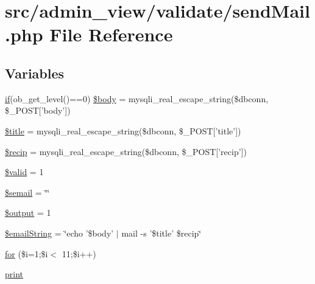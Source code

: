 \hypertarget{sendMail_8php}{\section{src/admin\-\_\-view/validate/send\-Mail.php \-File \-Reference}
\label{sendMail_8php}
}
\subsection*{\-Variables}
\begin{DoxyCompactItemize}
\item 
\hyperlink{updateBenchDB_8php_a0c1f2915e12defa9f4d515347d884dee}{if}(ob\-\_\-get\-\_\-level()==0) \hyperlink{sendMail_8php_a3413c11d1f6b9e38ea54c7dffc0e5ea3}{\$body} = mysqli\-\_\-real\-\_\-escape\-\_\-string(\$dbconn, \$\-\_\-\-P\-O\-S\-T\mbox{[}'body'\mbox{]})
\item 
\hyperlink{sendMail_8php_ada57e7bb7c152edad18fe2f166188691}{\$title} = mysqli\-\_\-real\-\_\-escape\-\_\-string(\$dbconn, \$\-\_\-\-P\-O\-S\-T\mbox{[}'title'\mbox{]})
\item 
\hyperlink{sendMail_8php_a6f4e87f5425e063c148526b2f75d2a3b}{\$recip} = mysqli\-\_\-real\-\_\-escape\-\_\-string(\$dbconn, \$\-\_\-\-P\-O\-S\-T\mbox{[}'recip'\mbox{]})
\item 
\hyperlink{sendMail_8php_a0587674d27d00ef497e08e53ccf45bbb}{\$valid} = 1
\item 
\hyperlink{sendMail_8php_a4bf9ea5c2d7c2941d7ed61f245159bbf}{\$semail} = \char`\"{}\char`\"{}
\item 
\hyperlink{sendMail_8php_a73004ce9cd673c1bfafd1dc351134797}{\$output} = 1
\item 
\hyperlink{sendMail_8php_a26bed4c7bf2dd10f80cfd792aba56800}{\$email\-String} = \char`\"{}echo '\$body' $|$ mail -\/s '\$title' \$recip\char`\"{}
\item 
\hyperlink{sendMail_8php_a97c5d50455f68774b384f988b990d00f}{for} (\$i=1;\$i$<$ 11;\$i++)
\item 
\hyperlink{sendMail_8php_a3ad3a4240c0f97c7e85aff5c52a454d4}{print}
\end{DoxyCompactItemize}


